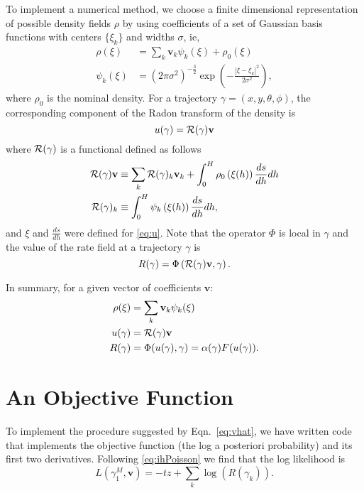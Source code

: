 \documentclass[twocolumn]{article}
\newcommand{\Radon}{{\cal R}}
\newcommand{\av}{\mathbf{v}}%
\newcommand{\loglike}{L}
\begin{document}
To implement a numerical method, we choose a finite dimensional
representation of possible density fields $\rho$ by using coefficients
of a set of Gaussian basis functions with centers $\{\xi_k\}$ and
widths $\sigma$, ie,
\begin{align*}
  \rho(\xi) &= \sum_k \av_k \psi_{k}(\xi) + \rho_0(\xi)\\
  \psi_{k}(\xi) &= \left(2\pi \sigma^2\right)^{-\frac{3}{2}} \exp\left(
    -\frac{\left| \xi - \xi_k \right|^2}{2\sigma^2} \right),
\end{align*}
where $\rho_0$ is the nominal density.  For a trajectory
$\gamma=(x,y,\theta,\phi)$, the corresponding component of the Radon
transform of the density is
\begin{equation*}
  u(\gamma) = \Radon(\gamma) \av
\end{equation*}
where $\Radon(\gamma)$ is a functional defined as follows
\begin{align*}
  \Radon(\gamma)\av &\equiv \sum_k \Radon(\gamma)_k \av_k + \int_0^H 
  \rho_0\left( \xi(h) \right) \frac{ds}{dh} dh\\
  \Radon(\gamma)_k &\equiv \int_0^H \psi_k \left( \xi(h) \right) \frac{ds}
  {dh} dh,
\end{align*}
and $\xi$ and $\frac{ds} {dh}$ were defined for \eqref{eq:u}.  Note
that the operator $\Phi$ is local in $\gamma$ and the value of the
rate field at a trajectory $\gamma$ is
\begin{equation*}
  R(\gamma) =\Phi \left( \Radon(\gamma)\av, \gamma \right).
\end{equation*}

In summary, for a given vector of coefficients $\av$:
\begin{align}
  \rho(\xi) &= \sum_k \av_k \psi_{k}(\xi) \\
  u(\gamma) &= \Radon(\gamma) \av \\
  R(\gamma) &= \Phi (u(\gamma),\gamma) =
  \alpha(\gamma)F(u(\gamma)).
\end{align}

\section{An Objective Function}
\label{sec:LL}

To implement the procedure suggested by Eqn.~\eqref{eq:vhat}, we have
written code that implements the objective function (the log a
posteriori probability) and its first two derivatives.  Following
\eqref{eq:ihPoisson} we find that the log likelihood is
\begin{equation*}
  \loglike(\gamma_1^M, \av) = -tz + \sum_k \log \left( R(\gamma_k)
  \right).
\end{equation*}
\end{document}
